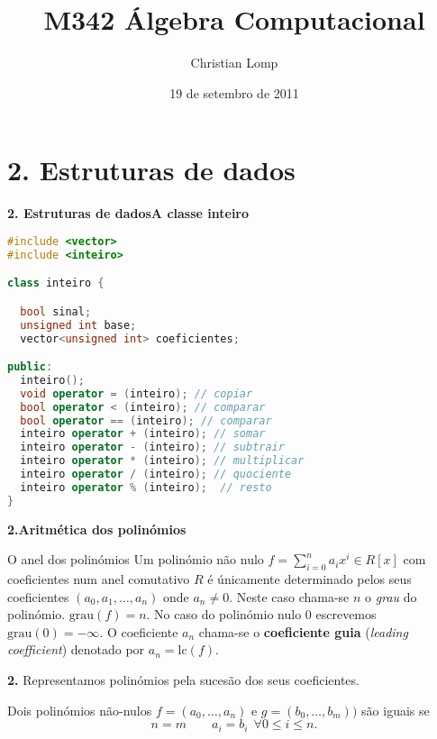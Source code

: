 \documentclass{beamer}
\title[M342]{M342 Álgebra Computacional}
\author{Christian Lomp}
\institute{FCUP}
\date{19 de setembro de 2011}
\newcommand{\grau}[1]{\mathrm{grau}({#1})}
\newcommand{\lc}[1]{\mathrm{lc}(#1)}
\begin{document}
\begin{frame}
\titlepage
\end{frame}





\section{2. Estruturas de dados}

\begin{frame}[fragile]{\bf 2. Estruturas de dados}{\bf A classe inteiro}

\lstset{language=C++,basicstyle=\tiny}
\begin{lstlisting}[language=C++]
#include <vector>
#include <inteiro>

class inteiro {

  bool sinal;
  unsigned int base;
  vector<unsigned int> coeficientes;

public:
  inteiro();
  void operator = (inteiro); // copiar 
  bool operator < (inteiro); // comparar
  bool operator == (inteiro); // comparar
  inteiro operator + (inteiro); // somar
  inteiro operator - (inteiro); // subtrair
  inteiro operator * (inteiro); // multiplicar
  inteiro operator / (inteiro); // quociente
  inteiro operator % (inteiro);  // resto
}

\end{lstlisting}
\end{frame}


\begin{frame}{\bf 2.}{\bf Aritmética dos polinómios}
\begin{block}{O anel dos polinómios}
Um polinómio não nulo $f=\sum_{i=0}^n a_i x^i \in R[x]$ com coeficientes num anel comutativo $R$ é únicamente determinado pelos seus coeficientes $(a_0,a_1,\ldots, a_n)$ onde $a_n\neq 0$. \pause Neste caso chama-se $n$ o {\it grau} do polinómio. $\grau{f}=n$. No caso do polinómio nulo $0$ escrevemos $\grau{0}=-\infty$.
\pause
O coeficiente $a_n$ chama-se o {\bf coeficiente guia} ({\it leading coefficient}) denotado por $a_n=\lc{f}$.
\end{block}
\end{frame}

\begin{frame}{\bf 2.}
Representamos polinómios pela sucesão dos seus coeficientes.

\pause 
Dois polinómios não-nulos $f=(a_0,\ldots, a_n)$ e $g=(b_0,\ldots, b_m))$ são iguais se
$$n=m \qquad a_i=b_i \:\:\forall 0\leq i\leq n.$$

\end{frame}
\end{document}
